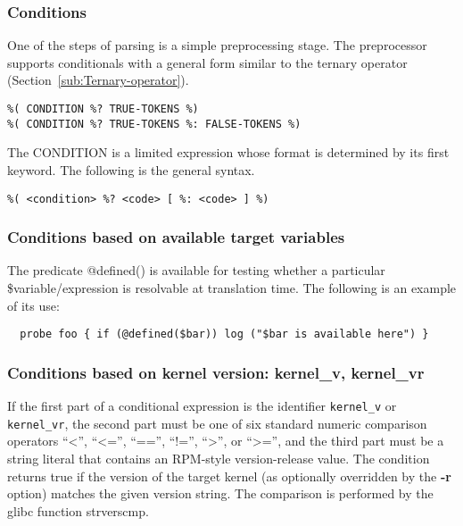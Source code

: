 \documentclass[twoside,english]{article}
\newenvironment{vindent}
{\begin{list}{}{\setlength{\listparindent}{6pt}}
\item[]}
{\end{list}}
\begin{document}
\subsubsection{Conditions}
One of the steps of parsing is a simple preprocessing stage.  The
preprocessor supports conditionals with a general form similar to the
ternary operator (Section~\ref{sub:Ternary-operator}).

\begin{vindent}
\begin{verbatim}
%( CONDITION %? TRUE-TOKENS %)
%( CONDITION %? TRUE-TOKENS %: FALSE-TOKENS %)
\end{verbatim}
\end{vindent}
The CONDITION is a limited expression whose format is determined by its first
keyword. The following is the general syntax.

\begin{vindent}
\begin{verbatim}
%( <condition> %? <code> [ %: <code> ] %)
\end{verbatim}
\end{vindent}

\subsubsection{Conditions based on available target variables}
The predicate @defined() is available for testing whether a
particular \$variable/expression is resolvable at translation time. The
following is an example of its use:

\begin{vindent}
\begin{verbatim}
  probe foo { if (@defined($bar)) log ("$bar is available here") }
\end{verbatim}
\end{vindent}


\subsubsection{Conditions based on kernel version: kernel\_v, kernel\_vr}
If the first part of a conditional expression is the identifier \texttt{kernel\_v}
or \texttt{kernel\_vr}, the second part must be one of six standard numeric
comparison operators {}``\textless'', {}``\textless ='', {}``=='', {}``!='', {}``\textgreater'',
or {}``\textgreater ='',
and the third part must be a string literal that contains an RPM-style version-release
value. The condition returns true if the version of the target kernel (as
optionally overridden by the \textbf{-r} option) matches the given version
string. The comparison is performed by the glibc function strverscmp.
\end{document}
